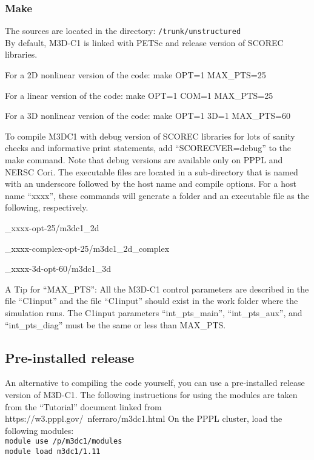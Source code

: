 \subsubsection{Make}
The sources are located in the directory: \texttt{/trunk/unstructured}
\\
By default, M3D-C1 is linked with PETSc and release version of SCOREC libraries.
\\
\begin{description}
\item 	For a 2D nonlinear version of the code:   	make OPT=1 MAX\_PTS=25
\item	For a linear version of the code:               		make OPT=1 COM=1 MAX\_PTS=25
\item	For a 3D nonlinear version of the code:     	make OPT=1 3D=1 MAX\_PTS=60
\end{description}
To compile M3DC1 with debug version of SCOREC libraries for lots of sanity checks and informative print statements, add “SCORECVER=debug” to the make command. Note that debug versions are available only on PPPL and NERSC Cori.
\newline\newline
The executable files are located in a sub-directory that is named with an underscore followed by the host name and compile options. For a host name “xxxx”, these commands will generate a folder and an executable file as the following, respectively.
\begin{description}
\item \_xxxx-opt-25/m3dc1\_2d
\item	\_xxxx-complex-opt-25/m3dc1\_2d\_complex
\item \_xxxx-3d-opt-60/m3dc1\_3d
\end{description}
A Tip for “MAX\_PTS”:  All the M3D-C1 control parameters are described in the file “C1input” and the file “C1input” should exist in the work folder where the simulation runs. The C1input parameters “int\_pts\_main”, “int\_pts\_aux”, and “int\_pts\_diag” must be the same or less than MAX\_PTS.

\subsection{Pre-installed release}
An alternative to compiling the code yourself, you can use a pre-installed release version of M3D-C1.    The following instructions for using the modules are taken from the “Tutorial” document linked from https://w3.pppl.gov/~nferraro/m3dc1.html
On the PPPL cluster, load the following modules:
\\
\texttt{module use /p/m3dc1/modules
\\
module load m3dc1/1.11
}

